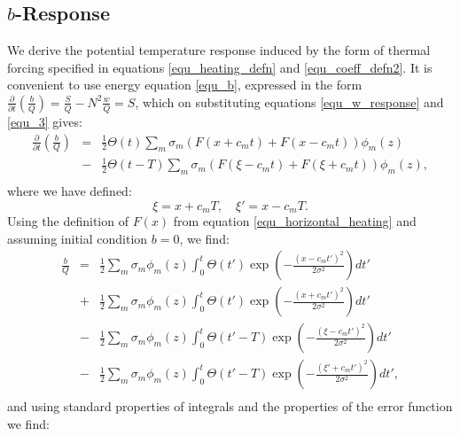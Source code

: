 \documentclass[a4paper,10pt]{article}
\newcommand{\heavi}{\Theta}
\begin{document}
\subsection{$b$-Response}
%
We derive the potential temperature response induced by the form of thermal forcing specified in equations \ref{equ_heating_defn} and \ref{equ_coeff_defn2}.
It is convenient to use energy equation \ref{equ_b}, expressed in the form $\frac{\partial  }{\partial t} \left( \frac{b}{Q}\right) = \frac{S}{Q} -  N^2 \frac{w}{Q} = S$, which
on substituting equations \ref{equ_w_response} and \ref{equ_3} gives:
%
\begin{eqnarray}
\frac{\partial }{\partial t} \left( \frac{b}{Q} \right)
                  & = & \frac{1}{2} \heavi( t)     \sum_m  \sigma_m  \left(  F(x + c_m t) + F(x - c_m t) \right)  \phi_m(z) \\ \nonumber
                  & -  & \frac{1}{2} \heavi( t-T)  \sum_m \sigma_m  \left( F( \xi - c_m t ) + F(\xi + c_m t)\right)  \phi_m(z), \\ \nonumber
\end{eqnarray}
%
where we have defined:
%
\begin{equation}
\xi = x + c_m T, \quad \xi' = x - c_m T.
\end{equation}
%
Using the definition of $F(x)$ from equation \ref{equ_horizontal_heating} and assuming initial condition $b=0$, we find:
%
\begin{eqnarray}
\frac{b}{Q} & = & \frac{1}{2}  \sum_m  \sigma_m  \phi_m(z)  \int_0^t \heavi( t') \exp \left(- \frac{ (x - c_m t')^2 }{2 \sigma^2 }\right) dt'  \\ \nonumber
                  & + & \frac{1}{2}  \sum_m  \sigma_m  \phi_m(z)  \int_0^t \heavi( t') \exp \left(- \frac{ (x +  c_m t')^2 }{2 \sigma^2 }\right) dt'  \\ \nonumber
		  & - & \frac{1}{2}  \sum_m  \sigma_m  \phi_m(z)  \int_0^t \heavi( t'-T) \exp \left(- \frac{ (\xi - c_m t')^2 }{2 \sigma^2 }\right) dt'  \\ \nonumber
		  & - & \frac{1}{2}  \sum_m  \sigma_m  \phi_m(z)  \int_0^t \heavi( t'-T) \exp \left(- \frac{ (\xi' + c_m t')^2 }{2 \sigma^2 }\right) dt',  \\ \nonumber
\end{eqnarray}
%
and using standard properties of integrals and the properties of the error function we find:
%
\end{document}
